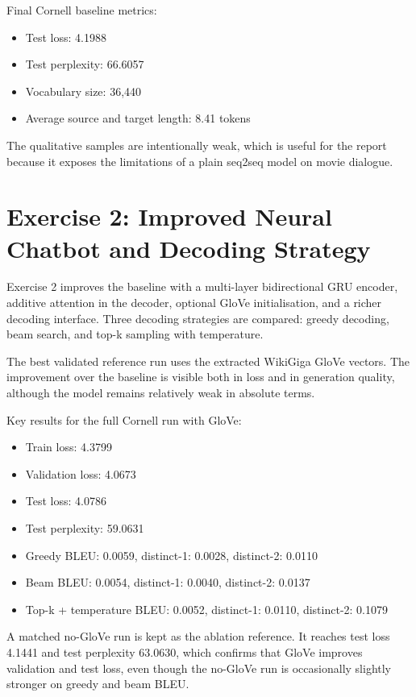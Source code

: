 \documentclass[11pt,a4paper]{article}
\begin{document}
Final Cornell baseline metrics:
\begin{itemize}[leftmargin=*]
	\item Test loss: 4.1988
	\item Test perplexity: 66.6057
	\item Vocabulary size: 36,440
	\item Average source and target length: 8.41 tokens
\end{itemize}

The qualitative samples are intentionally weak, which is useful for the report because it exposes the limitations of a plain seq2seq model on movie dialogue.

\section{Exercise 2: Improved Neural Chatbot and Decoding Strategy}
Exercise 2 improves the baseline with a multi-layer bidirectional GRU encoder, additive attention in the decoder, optional GloVe initialisation, and a richer decoding interface. Three decoding strategies are compared: greedy decoding, beam search, and top-k sampling with temperature.

The best validated reference run uses the extracted WikiGiga GloVe vectors. The improvement over the baseline is visible both in loss and in generation quality, although the model remains relatively weak in absolute terms.

Key results for the full Cornell run with GloVe:
\begin{itemize}[leftmargin=*]
	\item Train loss: 4.3799
	\item Validation loss: 4.0673
	\item Test loss: 4.0786
	\item Test perplexity: 59.0631
	\item Greedy BLEU: 0.0059, distinct-1: 0.0028, distinct-2: 0.0110
	\item Beam BLEU: 0.0054, distinct-1: 0.0040, distinct-2: 0.0137
	\item Top-k + temperature BLEU: 0.0052, distinct-1: 0.0110, distinct-2: 0.1079
\end{itemize}

A matched no-GloVe run is kept as the ablation reference. It reaches test loss 4.1441 and test perplexity 63.0630, which confirms that GloVe improves validation and test loss, even though the no-GloVe run is occasionally slightly stronger on greedy and beam BLEU.
\end{document}
